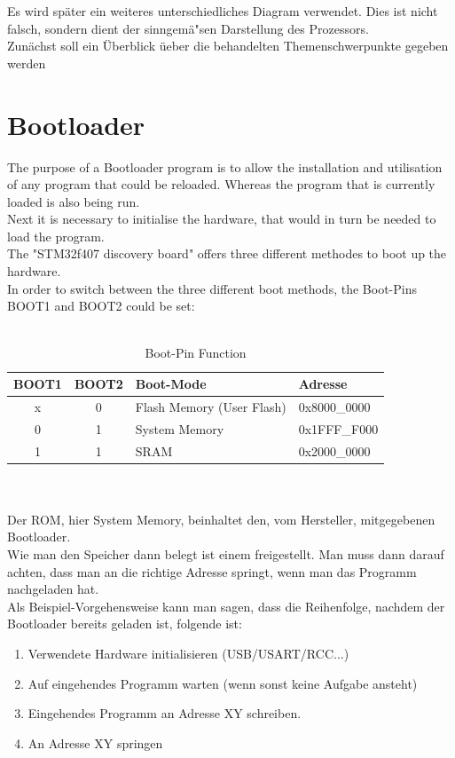 Es wird sp\"ater ein weiteres unterschiedliches Diagram verwendet. Dies ist nicht
falsch, sondern dient der sinngem\"a"sen Darstellung des Prozessors.\\


Zun\"achst soll ein \"Uberblick \"ueber die behandelten Themenschwerpunkte gegeben
 werden 

\section{Bootloader}
The purpose of a Bootloader program is to allow the installation and utilisation 
of any program that could be reloaded. Whereas the program that is currently loaded is also being run.\\
Next it is necessary to initialise the hardware, that would in turn be needed to load the program.\\
The "STM32f407 discovery board" offers three different methodes to boot up the hardware.\\
In order to switch between the three different boot methods, the Boot-Pins BOOT1
and BOOT2 could be set:\\\\
\begin{table}
\caption{Boot-Pin Function}
\begin{tabular}{|c|c|l|l|}
\hline \hline
  BOOT1 & BOOT2 & Boot-Mode & Adresse\\ \hline
  x & 0 & Flash Memory (User Flash) & 0x8000\_0000\\
\hline
  0 & 1 & System Memory & 0x1FFF\_F000\\
\hline
 1  & 1 & SRAM & 0x2000\_0000\\
\hline
\end{tabular}
\end{table}\\\\
Der ROM, hier System Memory, beinhaltet den, vom Hersteller, mitgegebenen
 Bootloader.\\
Wie man den Speicher dann belegt ist einem freigestellt. Man muss dann darauf
achten, dass man an die richtige Adresse springt, wenn man das Programm nachgeladen
hat.\\
Als Beispiel-Vorgehensweise kann man sagen, dass die Reihenfolge, nachdem der
Bootloader bereits geladen ist, folgende ist:\\

\begin{enumerate}
\item Verwendete Hardware initialisieren (USB/USART/RCC...)
\item Auf eingehendes Programm warten (wenn sonst keine Aufgabe ansteht)
\item Eingehendes Programm an Adresse XY schreiben.
\item An Adresse XY springen
\end{enumerate}

